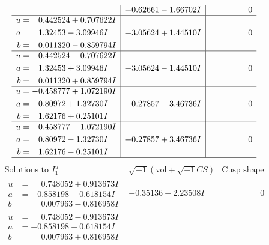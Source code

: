 \documentclass[1p]{elsarticle_modified}
\theoremstyle{definition}
\newcommand{\I}{\sqrt{-1}}
\begin{document}
$$\begin{array}{c|c|c}
 & -0.62661 - 1.66702 I & \phantom{-0.000000 } 0 \\ \hline\begin{aligned}
u &= \phantom{-}0.442524 + 0.707622 I \\
a &= \phantom{-}1.32453 - 3.09946 I \\
b &= \phantom{-}0.011320 - 0.859794 I\end{aligned}
 & -3.05624 + 1.44510 I & \phantom{-0.000000 } 0 \\ \hline\begin{aligned}
u &= \phantom{-}0.442524 - 0.707622 I \\
a &= \phantom{-}1.32453 + 3.09946 I \\
b &= \phantom{-}0.011320 + 0.859794 I\end{aligned}
 & -3.05624 - 1.44510 I & \phantom{-0.000000 } 0 \\ \hline\begin{aligned}
u &= -0.458777 + 1.072190 I \\
a &= \phantom{-}0.80972 + 1.32730 I \\
b &= \phantom{-}1.62176 + 0.25101 I\end{aligned}
 & -0.27857 - 3.46736 I & \phantom{-0.000000 } 0 \\ \hline\begin{aligned}
u &= -0.458777 - 1.072190 I \\
a &= \phantom{-}0.80972 - 1.32730 I \\
b &= \phantom{-}1.62176 - 0.25101 I\end{aligned}
 & -0.27857 + 3.46736 I & \phantom{-0.000000 } 0\\
 \hline 
 \end{array}$$\newpage$$\begin{array}{c|c|c}  
\text{Solutions to }I^u_{1}& \I (\text{vol} + \sqrt{-1}CS) & \text{Cusp shape}\\
 \hline 
\begin{aligned}
u &= \phantom{-}0.748052 + 0.913673 I \\
a &= -0.858198 - 0.618154 I \\
b &= \phantom{-}0.007963 - 0.816958 I\end{aligned}
 & -0.35136 + 2.23508 I & \phantom{-0.000000 } 0 \\ \hline\begin{aligned}
u &= \phantom{-}0.748052 - 0.913673 I \\
a &= -0.858198 + 0.618154 I \\
b &= \phantom{-}0.007963 + 0.816958 I\end{aligned}

\end{array}$$
\end{document}
